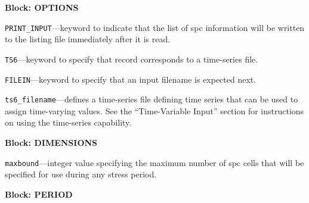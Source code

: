 
\item \textbf{Block: OPTIONS}

\begin{description}
\item \texttt{PRINT\_INPUT}---keyword to indicate that the list of spc information will be written to the listing file immediately after it is read.

\item \texttt{TS6}---keyword to specify that record corresponds to a time-series file.

\item \texttt{FILEIN}---keyword to specify that an input filename is expected next.

\item \texttt{ts6\_filename}---defines a time-series file defining time series that can be used to assign time-varying values. See the ``Time-Variable Input'' section for instructions on using the time-series capability.

\end{description}
\item \textbf{Block: DIMENSIONS}

\begin{description}
\item \texttt{maxbound}---integer value specifying the maximum number of spc cells that will be specified for use during any stress period.

\end{description}
\item \textbf{Block: PERIOD}

